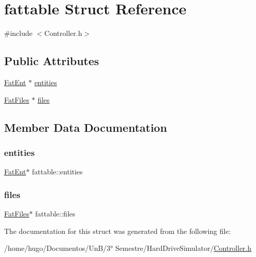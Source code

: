 \hypertarget{structfattable}{}\section{fattable Struct Reference}
\label{structfattable}


{\ttfamily \#include $<$Controller.\+h$>$}

\subsection*{Public Attributes}
\begin{DoxyCompactItemize}
\item 
\hyperlink{Controller_8h_abedaca4384c1842591e79536cf3429da}{Fat\+Ent} $\ast$ \hyperlink{structfattable_a4e31b87aba182a44fe755682965bc221}{entities}
\item 
\hyperlink{Controller_8h_aa84916cacfe28babf283e252f87b011e}{Fat\+Files} $\ast$ \hyperlink{structfattable_a2f4dd84fc0a68f4a54474fa215daf677}{files}
\end{DoxyCompactItemize}


\subsection{Member Data Documentation}
\mbox{\label{structfattable_a4e31b87aba182a44fe755682965bc221}} 
\subsubsection{\texorpdfstring{entities}{entities}}
{\footnotesize\ttfamily \hyperlink{Controller_8h_abedaca4384c1842591e79536cf3429da}{Fat\+Ent}$\ast$ fattable\+::entities}

\mbox{\label{structfattable_a2f4dd84fc0a68f4a54474fa215daf677}} 
\subsubsection{\texorpdfstring{files}{files}}
{\footnotesize\ttfamily \hyperlink{Controller_8h_aa84916cacfe28babf283e252f87b011e}{Fat\+Files}$\ast$ fattable\+::files}



The documentation for this struct was generated from the following file\+:\begin{DoxyCompactItemize}
\item 
/home/hugo/\+Documentos/\+Un\+B/3° Semestre/\+Hard\+Drive\+Simulator/\hyperlink{Controller_8h}{Controller.\+h}\end{DoxyCompactItemize}
